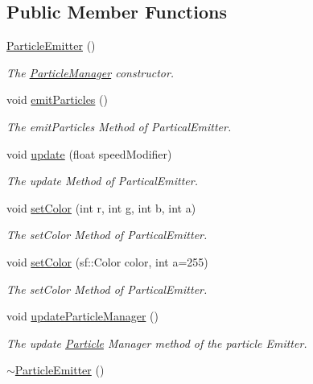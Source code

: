 \subsection*{Public Member Functions}
\begin{DoxyCompactItemize}
\item 
\hypertarget{class_particle_emitter_a31313702250800a4e074286b8e5d5116}{\hyperlink{class_particle_emitter_a31313702250800a4e074286b8e5d5116}{Particle\+Emitter} ()}\label{class_particle_emitter_a31313702250800a4e074286b8e5d5116}

\begin{DoxyCompactList}\small\item\em The \hyperlink{class_particle_manager}{Particle\+Manager} constructor. \end{DoxyCompactList}\item 
void \hyperlink{class_particle_emitter_a59e863f0386f1de946bb5f5a2eef3358}{emit\+Particles} ()
\begin{DoxyCompactList}\small\item\em The emit\+Particles Method of Partical\+Emitter. \end{DoxyCompactList}\item 
void \hyperlink{class_particle_emitter_a1567fd71b41c71b56ee8b72c5bca559c}{update} (float speed\+Modifier)
\begin{DoxyCompactList}\small\item\em The update Method of Partical\+Emitter. \end{DoxyCompactList}\item 
void \hyperlink{class_particle_emitter_aa639c76a4637bba568a407f69e1c8ebd}{set\+Color} (int r, int g, int b, int a)
\begin{DoxyCompactList}\small\item\em The set\+Color Method of Partical\+Emitter. \end{DoxyCompactList}\item 
void \hyperlink{class_particle_emitter_ac2d2189e309f8e557b214963aeb8aef8}{set\+Color} (sf\+::\+Color color, int a=255)
\begin{DoxyCompactList}\small\item\em The set\+Color Method of Partical\+Emitter. \end{DoxyCompactList}\item 
void \hyperlink{class_particle_emitter_aa1feb698e1cb96591596b38ce595e9a1}{update\+Particle\+Manager} ()
\begin{DoxyCompactList}\small\item\em The update \hyperlink{class_particle}{Particle} Manager method of the particle Emitter. \end{DoxyCompactList}\item 
\hypertarget{class_particle_emitter_a6f4952f7555ede99d74d42b30c80f3e2}{\hyperlink{class_particle_emitter_a6f4952f7555ede99d74d42b30c80f3e2}{$\sim$\+Particle\+Emitter} ()}\label{class_particle_emitter_a6f4952f7555ede99d74d42b30c80f3e2}


\end{DoxyCompactItemize}
